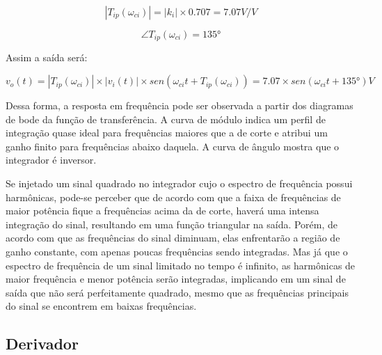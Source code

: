 \begin{center}
\begin{equation} \label{int:1}
       |T_{ip}(\omega_{ci})| = |k_i| \times 0.707 = 7.07 V/V
\end{equation}
\end{center}

\begin{center}
\begin{equation} \label{int:2}
       \angle T_{ip}(\omega_{ci})  = 135°
\end{equation}
\end{center}

Assim a saída será:

\begin{center}
\begin{equation} \label{int:3}
       v_o(t) = |T_{ip}(\omega_{ci})| \times |v_i(t)| \times sen(\omega_{ci}t + T_{ip}(\omega_{ci})) = 7.07\times sen(\omega_{ci}t + 135°) V
\end{equation}
\end{center}

Dessa forma, a resposta em frequência pode ser observada a partir dos diagramas de bode da função de transferência. A curva de módulo indica um perfil de integração quase ideal para frequências maiores que a de corte e atribui um ganho finito para frequências abaixo daquela. A curva de ângulo mostra que o integrador é inversor.

Se injetado um sinal quadrado no integrador cujo o espectro de frequência possui harmônicas, pode-se perceber que de acordo com que a faixa de frequências de maior potência fique a frequências acima da de corte, haverá uma intensa integração do sinal, resultando em uma função triangular na saída. Porém, de acordo com que as frequências do sinal diminuam, elas enfrentarão a região de ganho constante, com apenas poucas frequências sendo integradas. Mas já que o espectro de frequência de um sinal limitado no tempo é infinito, as harmônicas de maior frequência e menor potência serão integradas, implicando em um sinal de saída que não será perfeitamente quadrado, mesmo que as frequências principais do sinal se encontrem em baixas frequências.





\subsection{Derivador}

